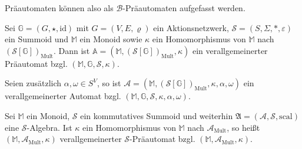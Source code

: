 \documentclass{article}
\begin{document}
\begin{remark}
  Präautomaten können also als $\mathcal{B}$-Präautomaten aufgefasst werden.
\end{remark}

\begin{definition}
  Sei $\mathbb{G} = (G, \star, \text{id})$ mit $G = (V, E, \varrho)$ ein Aktionsnetzwerk, 
  $\mathcal{S} = (S, \Sigma, \ast, \varepsilon)$ ein Summoid
  und $\mathbb{M}$ ein Monoid
  sowie $\kappa$ ein Homomorphismus von $\mathbb{M}$ nach $(\mathcal{S}[\mathbb{G}])_\text{Mult}$.
  Dann ist $\mathbb{A} = (\mathbb{M}, (\mathcal{S}[\mathbb{G}])_\text{Mult}, \kappa)$
  ein verallgemeinerter Präautomat bzgl. $(\mathbb{M}, \mathbb{G}, \mathcal{S}, \kappa)$.

  Seien zusätzlich $\alpha, \omega \in S^V$,
  so ist
  $\mathcal{A} = (\mathbb{M}, (\mathcal{S}[\mathbb{G}])_\text{Mult}, \kappa, \alpha, \omega)$
  ein verallgemeinerter Automat
  bzgl. $(\mathbb{M}, \mathbb{G}, \mathcal{S}, \kappa, \alpha, \omega)$.
\end{definition}

\begin{definition}
  Sei $\mathbb{M}$ ein Monoid,
  $\mathcal{S}$ ein kommutatives Summoid
  und weiterhin $\mathfrak{A} = (\mathcal{A}, \mathcal{S}, \text{scal})$
  eine $\mathcal{S}$-Algebra.
  Ist $\kappa$ ein Homomorphismus von $\mathbb{M}$ nach $\mathcal{A}_\text{Mult}$,
  so heißt $(\mathbb{M}, \mathcal{A}_\text{Mult}, \kappa)$
  verallgemeinerter $\mathcal{S}$-Präautomat bzgl. $(\mathbb{M}, \mathcal{A}_\text{Mult}, \kappa)$.
\end{definition}
\end{document}
